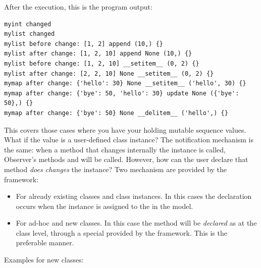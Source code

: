 After the execution, this is the program output:

{ \codesize 
\begin{verbatim} 
myint changed
mylist changed
mylist before change: [1, 2] append (10,) {}
mylist after change: [1, 2, 10] append None (10,) {}
mylist before change: [1, 2, 10] __setitem__ (0, 2) {}
mylist after change: [2, 2, 10] None __setitem__ (0, 2) {}
mymap after change: {'hello': 30} None __setitem__ ('hello', 30) {}
mymap after change: {'bye': 50, 'hello': 30} update None ({'bye': 50},) {}
mymap after change: {'bye': 50} None __delitem__ ('hello',) {}
\end{verbatim}
}

This covers those cases where you have your \OPS holding mutable
sequence values. What if the value is a user-defined class instance?
The notification mechanism is the same: when a method 
that changes internally the instance is called, Observer's methods
 and  will be called. However, how can the user
declare that method  \emph{does changes} the instance?
Two mechanism are provided by the framework:
\begin{itemize}
\item For already existing classes and class instances. In this cases
  the declaration occurs when the instance is assigned to the \OP in
  the model.
\item For ad-hoc and new classes. In this case the method will be
  \emph{declared} as  at the class level, through a
  special  provided by the framework. This is the
  preferable manner. 
\end{itemize}

Examples for new classes:

